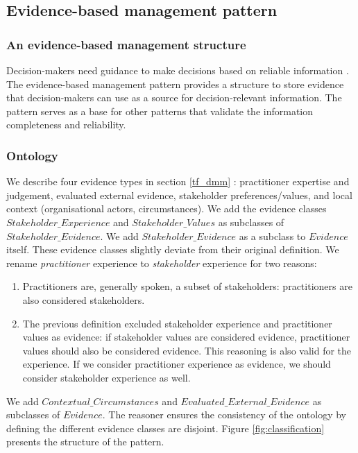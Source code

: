\subsection{Evidence-based management pattern} \label{odp_ebm}
\subsubsection{An evidence-based management structure}
Decision-makers need guidance to make decisions based on reliable information \parencite{DM07}. The evidence-based management pattern provides a structure to store evidence that decision-makers can use as a source for decision-relevant information. The pattern serves as a base for other patterns that validate the information completeness and reliability.

\begin{center}
\large\color{document}{The evidence-based management pattern supports the information completeness and reliability validation patterns by providing an evidence-based management structure.}
\end{center}

\subsubsection{Ontology}
We describe four evidence types in section \ref{tf_dmm} : practitioner expertise and judgement, evaluated external evidence, stakeholder preferences/values, and local context (organisational actors, circumstances). We add the evidence classes $Stakeholder\_Experience$ and $Stakeholder\_Values$ as subclasses of $Stakeholder\_Evidence$. We add $Stakeholder\_Evidence$ as a subclass to $Evidence$ itself. These evidence classes slightly deviate from their original definition. We rename \emph{practitioner} experience to \emph{stakeholder} experience for two reasons:
\begin{enumerate}
\item Practitioners are, generally spoken, a subset of stakeholders: practitioners are also considered stakeholders.
\item The previous definition excluded stakeholder experience and practitioner values as evidence: if stakeholder values are considered evidence, practitioner values should also be considered evidence. This reasoning is also valid for the experience. If we consider practitioner experience as evidence, we should consider stakeholder experience as well. 
\end{enumerate}
We add $Contextual\_Circumstances$ and $Evaluated\_External\_Evidence$ as subclasses of $Evidence$. The reasoner ensures the consistency of the ontology by defining the different evidence classes are disjoint. Figure \ref{fig:classification} presents the structure of the pattern.

